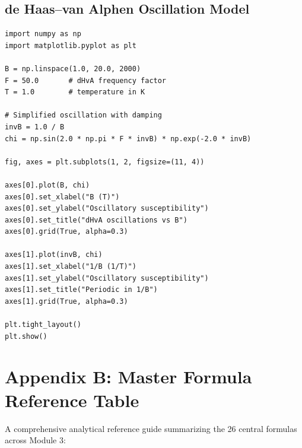 \documentclass[11pt,a4paper]{article}
\begin{document}
\subsection{de Haas--van Alphen Oscillation Model}

\begin{lstlisting}
import numpy as np
import matplotlib.pyplot as plt

B = np.linspace(1.0, 20.0, 2000)
F = 50.0       # dHvA frequency factor
T = 1.0        # temperature in K

# Simplified oscillation with damping
invB = 1.0 / B
chi = np.sin(2.0 * np.pi * F * invB) * np.exp(-2.0 * invB)

fig, axes = plt.subplots(1, 2, figsize=(11, 4))

axes[0].plot(B, chi)
axes[0].set_xlabel("B (T)")
axes[0].set_ylabel("Oscillatory susceptibility")
axes[0].set_title("dHvA oscillations vs B")
axes[0].grid(True, alpha=0.3)

axes[1].plot(invB, chi)
axes[1].set_xlabel("1/B (1/T)")
axes[1].set_ylabel("Oscillatory susceptibility")
axes[1].set_title("Periodic in 1/B")
axes[1].grid(True, alpha=0.3)

plt.tight_layout()
plt.show()
\end{lstlisting}

\clearpage

\section{Appendix B: Master Formula Reference Table}
\label{sec:appendix_formulas}

\noindent A comprehensive analytical reference guide summarizing the 26 central formulas across Module 3:
\end{document}
